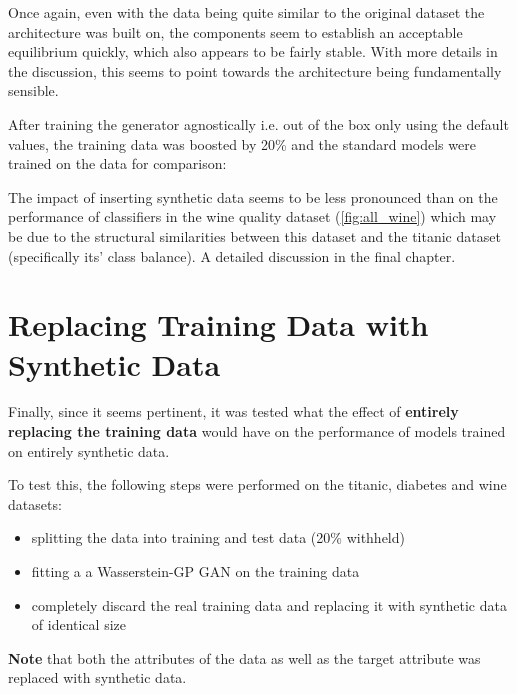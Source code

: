 Once again, even with the data being quite similar to the original dataset the architecture was built on, the components seem to establish an acceptable equilibrium quickly, which also appears to be fairly stable. With more details in the discussion, this seems to point towards the architecture being fundamentally sensible.

After training the generator agnostically i.e. out of the box only using the default values, the training data was boosted by 20\% and the standard models were trained on the data for comparison:

\pagebreak


\pagebreak

The impact of inserting synthetic data seems to be less pronounced than on the performance of classifiers in the wine quality dataset (\ref{fig:all_wine}) which may be due to the structural similarities between this dataset and the titanic dataset (specifically its' class balance).
A detailed discussion in the final chapter.

\clearpage

\section{Replacing Training Data with Synthetic Data}

Finally, since it seems pertinent, it was tested what the effect of \textbf{entirely replacing the training data} would have on the performance of models trained on entirely synthetic data.

To test this, the following steps were performed on the titanic, diabetes and wine datasets: 

\begin{itemize}
	\item splitting the data into training and test data (20\% withheld)
	\item fitting a a Wasserstein-GP \ac{GAN} on the training data
	\item completely discard the real training data and replacing it with synthetic data of identical size
\end{itemize}

\textbf{Note} that both the attributes of the data as well as the target attribute was replaced with synthetic data.

